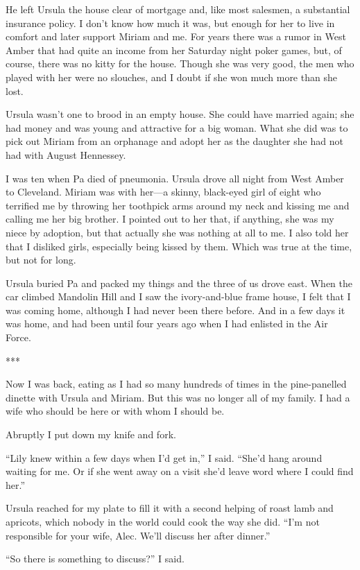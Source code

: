 \documentclass{novel}
\begin{document}
He left Ursula the house clear of mortgage and, like most salesmen, a substantial insurance policy. I don’t know how much it was, but enough for her to live in comfort and later support Miriam and me. For years there was a rumor in West Amber that had quite an income from her Saturday night poker games, but, of course, there was no kitty for the house. Though she was very good, the men who played with her were no slouches, and I doubt if she won much more than she lost.

Ursula wasn’t one to brood in an empty house. She could have married again; she had money and was young and attractive for a big woman. What she did was to pick out Miriam from an orphanage and adopt her as the daughter she had not had with August Hennessey.

I was ten when Pa died of pneumonia. Ursula drove all night from West Amber to Cleveland. Miriam was with her—a skinny, black-eyed girl of eight who terrified me by throwing her toothpick arms around my neck and kissing me and calling me her big brother. I pointed out to her that, if anything, she was my niece by adoption, but that actually she was nothing at all to me. I also told her that I disliked girls, especially being kissed by them. Which was true at the time, but not for long.

Ursula buried Pa and packed my things and the three of us drove east. When the car climbed Mandolin Hill and I saw the ivory-and-blue frame house, I felt that I was coming home, although I had never been there before. And in a few days it was home, and had been until four years ago when I had enlisted in the Air Force.

***

Now I was back, eating as I had so many hundreds of times in the pine-panelled dinette with Ursula and Miriam. But this was no longer all of my family. I had a wife who should be here or with whom I should be.

Abruptly I put down my knife and fork.

“Lily knew within a few days when I’d get in,” I said. “She’d hang around waiting for me. Or if she went away on a visit she’d leave word where I could find her.”

Ursula reached for my plate to fill it with a second helping of roast lamb and apricots, which nobody in the world could cook the way she did. “I’m not responsible for your wife, Alec. We’ll discuss her after dinner.”

“So there is something to discuss?” I said.
\end{document}
